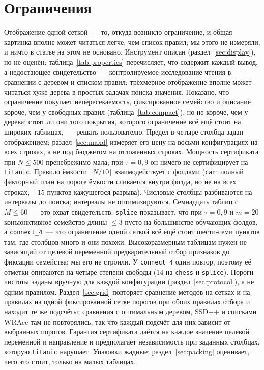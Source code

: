 \documentclass[11pt]{article}
\begin{document}
\section{Ограничения}
Отображение одной сеткой~--- то, откуда возникло ограничение, и общая картинка вполне может читаться легче, чем список правил; мы этого не измеряли, и ничто в статье на этом не основано. Инструмент описан (раздел~\ref{sec:display}), но не оценён: таблица~\ref{tab:properties} перечисляет, что содержит каждый вывод, а недостающее свидетельство~--- контролируемое исследование чтения в сравнении с деревом и списком правил; трёхмерное отображение вполне может читаться хуже дерева в простых задачах поиска значения. Показано, что ограничение покупает непересекаемость, фиксированное семейство и описание короче, чем у свободных правил (таблица~\ref{tab:compact}), но не короче, чем у дерева; стоят ли они того покрытия, которого ограничение всё ещё стоит на широких таблицах,~--- решать пользователю. Предел в четыре столбца задан отображением; раздел~\ref{sec:maxd} измеряет его цену на восьми конфигурациях на всех строках, а не под бюджетом на отложенных строках. Мощность сертификата при $N\le 500$ пренебрежимо мала; при $\tau=0{,}9$ он ничего не сертифицирует на \texttt{titanic}. Правило ёмкости $\lfloor N/10\rfloor$ взаимодействует с фолдами (\texttt{car}: полный факторный план на пороге ёмкости сливается внутри фолда, но не на всех строках, $+15$ пунктов кажущегося разрыва). Числовые столбцы разбиваются на интервалы до поиска; интервалы не оптимизируются. Семнадцать таблиц с $M\le 60$~--- это охват свидетельств; \texttt{splice} показывает, что при $\tau=0{,}9$ и $m=20$ конъюнктивное семейство длины $\le3$ пусто на большинстве обучающих фолдов, а \texttt{connect\_4}~--- что ограничение одной сеткой всё ещё стоит шести-семи пунктов там, где столбцов много и они похожи. Высокоразмерным таблицам нужен не зависящий от целевой переменной предварительный отбор признаков до фиксации семейства; мы его не строили. У \texttt{connect\_4} один повтор, поэтому её отметки опираются на четыре степени свободы (14 на \texttt{chess} и \texttt{splice}). Пороги чистоты заданы вручную для каждой конфигурации (раздел~\ref{sec:protocol}), а не одним правилом. Раздел~\ref{sec:grid} повторяет сравнение методов на сетках и на правилах на одной фиксированной сетке порогов при обоих правилах отбора и находит те же подсчёты; сравнения с оптимальным деревом, SSD++ и списками WRAcc там не повторялись, так что каждый подсчёт для них зависит от выбранных порогов. Гарантия сертификата даётся на каждое значение целевой переменной и направление и предполагает независимость при заданных столбцах, которую \texttt{titanic} нарушает. Упаковки жадные; раздел~\ref{sec:packing} оценивает, чего это стоит, только на малых таблицах.
\end{document}
